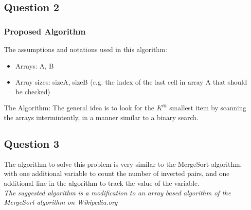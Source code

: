 \documentclass{article}
\begin{document}
\subsection*{Question 2}
\subsubsection*{Proposed Algorithm}
The assumptions and notations used in this algorithm:
\begin{itemize}
  \item Arrays: A, B
  \item Array sizes: sizeA, sizeB (e.g. the index of the last cell in array A
  that should be checked)
\end{itemize}

\raggedright The Algorithm: The general idea is to look for the $K^{th}$
smallest item by scanning the arrays intermintently, in a manner similar to a
binary search.\\
\vfill

\subsection*{Question 3}
The algorithm to solve this problem is very similar to the MergeSort algorithm,
with one additional variable to count the number of inverted pairs, and one
additional line in the algorithm to track the value of the variable.\\
\textit{The suggested algorithm is a modification to an array based algorithm
of the MergeSort algorithm on Wikipedia.org}\\
\end{document}
